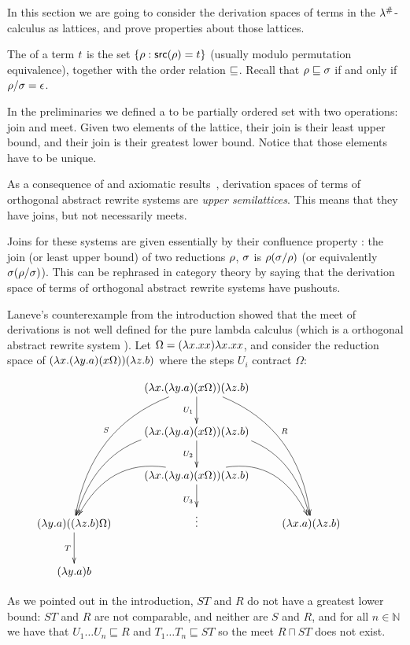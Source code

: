 In this section we are going to consider the derivation spaces of terms in
the $\lambda^{\mathtt{\#}}$-calculus as lattices, and prove properties about those lattices.

The  of a term $t$ is the set
$\{\rho : \mathsf{src}(\rho) = t\}$ (usually modulo permutation equivalence),
together with the order relation $\sqsubseteq$.
Recall that
$\rho \sqsubseteq \sigma$ if and only if $\rho / \sigma = \epsilon$.

In the preliminaries we defined a  to be partially ordered set with two operations:
join and meet. Given two elements of the lattice, their join is their least upper bound,
and their join is their greatest lower bound. Notice that those elements have to be unique.

As a consequence of
and axiomatic results~\cite{thesismellies},
derivation spaces of terms of orthogonal abstract rewrite systems are
\emph{upper semilattices}. This means that they have joins, but not necessarily meets.

Joins for these systems are given essentially by their confluence property :
the join (or least upper bound)
of two reductions $\rho$, $\sigma$ is $\rho (\sigma / \rho)$
(or equivalently $\sigma (\rho / \sigma)$).
This can be rephrased in category theory by saying that the derivation space of
terms of orthogonal abstract rewrite systems have pushouts.

\begin{example} Laneve's counterexample from the introduction
showed that the meet of derivations is not well defined for the pure lambda calculus
(which is a orthogonal abstract rewrite system ).
Let $\Omega = (\lambda x. xx)\lambda x. xx$,
and consider the reduction space of
$(\lambda x. (\lambda y. a)(x \Omega)) (\lambda z. b)$
where the steps $U_i$ contract $\Omega$:

\[
  \xymatrix{
    &
    (\lam{\var}{(\lam{\vartwo}{a})(\var \Omega)}) (\lam{\varthree}{b})
    \ar_{U_1}[d]
    \ar@/_1cm/_{S}[dddl]
    \ar@/^1cm/^{R}[dddr]
    &
  \\
    &
    (\lam{\var}{(\lam{\vartwo}{a})(\var \Omega)}) (\lam{\varthree}{b})
    \ar@/_1cm/[ddl] \ar@/^1cm/[ddr]
    \ar_{U_2}[d]
    &
  \\
    &
    (\lam{\var}{(\lam{\vartwo}{a})(\var \Omega)}) (\lam{\varthree}{b})
    \ar@/_1cm/[dl] \ar@/^1cm/[dr]
    \ar_{U_3}[d]
    &
  \\
    (\lam{\vartwo}{a})((\lam{\varthree}{b}) \Omega)
    \ar_{T}[d]
    &
    \vdots
    &
    (\lam{\var}{a})(\lam{\varthree}{b})
  \\
    (\lam{\vartwo}{a}) b
    &
    &
    &
  }
\]

As we pointed out in the introduction,
$ST$ and $R$ do not have a greatest lower bound: $ST$ and $R$ are not
comparable, and neither are $S$ and $R$,
and for all $n \in \mathbb{N}$ we have that $U_1 \hdots U_n \sqsubseteq R$
and $T_1 \hdots T_n \sqsubseteq ST$ so the meet $R \sqcap ST$ does not exist.
\end{example}

